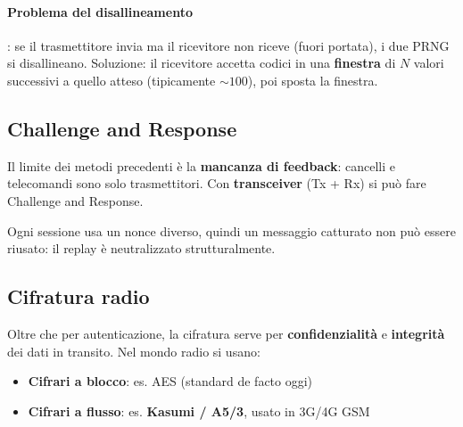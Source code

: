 \paragraph{Problema del disallineamento}: se il trasmettitore invia ma il ricevitore non riceve (fuori portata), i due PRNG si disallineano. Soluzione: il ricevitore accetta codici in una \textbf{finestra} di $N$ valori successivi a quello atteso (tipicamente $\sim 100$), poi sposta la finestra.


\subsection{Challenge and Response}

Il limite dei metodi precedenti \`e la \textbf{mancanza di feedback}: cancelli e telecomandi sono solo trasmettitori. Con \textbf{transceiver} (Tx + Rx) si pu\`o fare Challenge and Response.


Ogni sessione usa un nonce diverso, quindi un messaggio catturato non pu\`o essere riusato: il replay \`e neutralizzato strutturalmente.

\subsection{Cifratura radio}

Oltre che per autenticazione, la cifratura serve per \textbf{confidenzialit\`a} e \textbf{integrit\`a} dei dati in transito. Nel mondo radio si usano:
\begin{itemize}
  \item \textbf{Cifrari a blocco}: es. AES (standard de facto oggi)
  \item \textbf{Cifrari a flusso}: es. \textbf{Kasumi / A5/3}, usato in 3G/4G GSM
\end{itemize}

